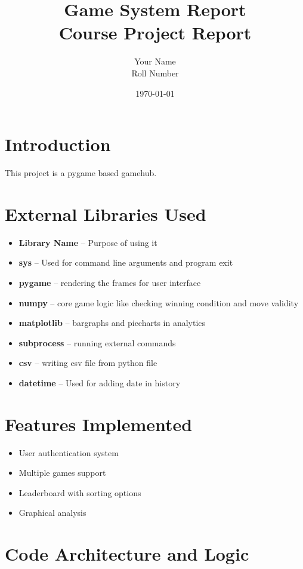 \documentclass[12pt]{article}
\title{
    \textbf{Game System Report}\\
    \large Course Project Report
}
\author{Your Name \\ Roll Number}
\date{\today}
\begin{document}
\maketitle
\tableofcontents
\newpage

\section{Introduction}
This project is a pygame based gamehub.

\section{External Libraries Used}
\begin{itemize}
    \item \textbf{Library Name} -- Purpose of using it
    \item \textbf{sys} -- Used for command line arguments and program exit
    \item \textbf{pygame} -- rendering the frames for user interface
    \item \textbf{numpy} -- core game logic like checking winning condition and move validity
    \item \textbf{matplotlib} -- bargraphs and piecharts in analytics
    \item \textbf{subprocess} -- running external commands
    \item \textbf{csv} -- writing csv file from python file
    \item \textbf{datetime} -- Used for adding date in history
\end{itemize}

\section{Features Implemented}
\begin{itemize}
    \item User authentication system
    \item Multiple games support
    \item Leaderboard with sorting options
    \item Graphical analysis
\end{itemize}

\section{Code Architecture and Logic}
\end{document}
